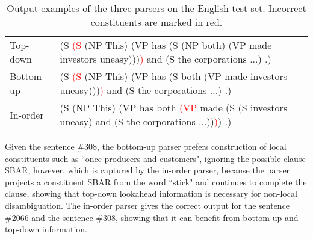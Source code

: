 \documentclass[11pt,letterpaper]{article}
\begin{document}
\begin{table*}[!tp]
\begin{center}
\begin{tabular}{>{\small}l|>{\small}l}
Top-down &  (S \textcolor{red}{(S} (NP This) (VP has (S (NP both) (VP made investors uneasy)))\textcolor{red}{)} and (S the corporations ...) .) \\
Bottom-up & (S \textcolor{red}{(S} (NP This) (VP has (S both (VP made investors uneasy)))\textcolor{red}{)} and (S the corporations ...) .) \\
In-order & (S (NP This) (VP has both \textcolor{red}{(VP} made (S (S investors uneasy) and (S the corporations ...))\textcolor{red}{)}) .) \\
\hline
\end{tabular}
\end{center}
\caption{\label{example} Output examples of the three parsers on the English test set. Incorrect constituents are marked in red.}
\end{table*}




Given the sentence \#308, the bottom-up parser prefers construction of local constituents such as ``once producers and customers", ignoring the possible clause SBAR, however, which is captured by the in-order parser, because the parser projects a constituent SBAR from the word ``stick" and continues to complete the clause, showing that top-down lookahead information is necessary for non-local disambiguation.
The in-order parser gives the correct output for the sentence \#2066 and the sentence \#308, showing that it can benefit from bottom-up and top-down information.
\end{document}
